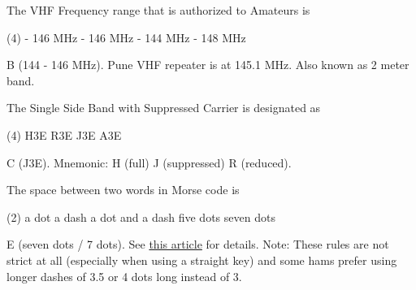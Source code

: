 \documentclass[a4paper]{article}
\begin{document}
\vspace{5mm}



\begin{question}The VHF Frequency range that is authorized to Amateurs is \spaces
	\begin{tasks}(4)
		 - 146 MHz
		 - 146 MHz
		 - 144 MHz
		 - 148 MHz
	\end{tasks}
\end{question}

\begin{solution}
	B (144 - 146 MHz). Pune VHF repeater is at 145.1 MHz. Also known as 2 meter band.
\end{solution}

\vspace{5mm}



\begin{question}The \apostrophe{}Single Side Band with Suppressed Carrier\apostrophe{} is designated as \spaces
	\begin{tasks}(4)
		\task H3E
		\task R3E
		\task J3E
		\task A3E
	\end{tasks}
\end{question}

\begin{solution}
	C (J3E). Mnemonic: H (full) J (suppressed) R (reduced).
\end{solution}

\vspace{5mm}



\begin{question}The space between two words in Morse code is \spaces
	\begin{tasks}(2)
		\task a dot
		\task a dash
		\task a dot and a dash
		\task five dots
		\task seven dots
	\end{tasks}
\end{question}

\begin{solution}
	E (seven dots / 7 dots). See \href{http://www.giangrandi.ch/electronics/radio/morse.shtml}{this article} for details. Note: These rules are not strict at all (especially when using a straight key) and some hams prefer using longer dashes of 3.5 or 4 dots long instead of 3.
\end{solution}

\vspace{5mm}
\end{document}
